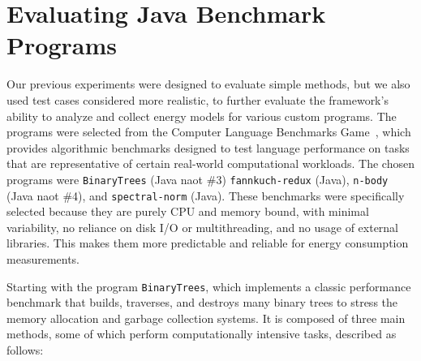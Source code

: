 

\section{Evaluating Java Benchmark Programs} \label{sec:evaluating_java_benchmark_programs}

Our previous experiments were designed to evaluate simple methods, but we also used test cases considered more realistic, to further evaluate the framework’s ability to analyze and collect energy models for various custom programs. The programs were selected from the Computer Language Benchmarks Game~\cite{benchmarksGameJava}, which provides algorithmic benchmarks designed to test language performance on tasks that are representative of certain real-world computational workloads. The chosen programs were \texttt{BinaryTrees} (Java naot \#3) \texttt{fannkuch-redux} (Java), \texttt{n-body} (Java naot \#4), and \texttt{spectral-norm} (Java). These benchmarks were specifically selected because they are purely CPU and memory bound, with minimal variability, no reliance on disk I/O or multithreading, and no usage of external libraries. This makes them more predictable and reliable for energy consumption measurements.


{\color{blue}Starting with the program \texttt{BinaryTrees}, which implements a classic performance benchmark that builds, traverses, and destroys many binary trees to stress the memory allocation and garbage collection systems. It is composed of three main methods, some of which perform computationally intensive tasks, described as follows:}

